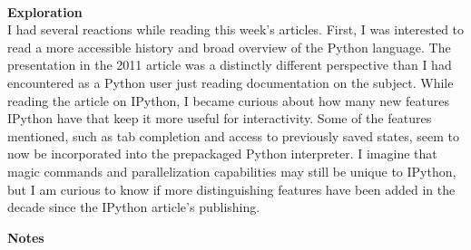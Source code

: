 \documentclass{report}
\begin{document}
\-\\
\textbf{Exploration}\\
I had several reactions while reading this week's articles. First, I was interested to read a more accessible history and broad overview of the Python language. The presentation in the 2011 article was a distinctly different perspective than I had encountered as a Python user just reading documentation on the subject. While reading the article on IPython, I became curious about how many new features IPython have that keep it more useful for interactivity. Some of the features mentioned, such as tab completion and access to previously saved states, seem to now be incorporated into the prepackaged Python interpreter. I imagine that magic commands and parallelization capabilities may still be unique to IPython, but I am curious to know if more distinguishing features have been added in the decade since the IPython article's publishing.

\newpage

\textbf{Notes}\\
\end{document}
